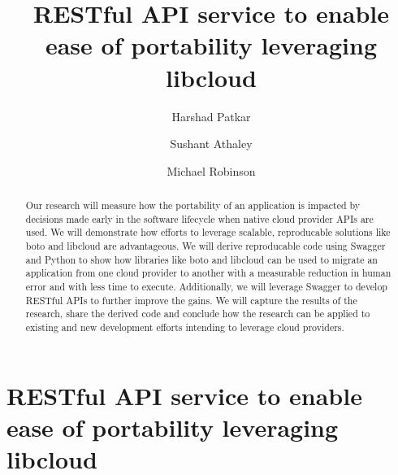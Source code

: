 
\title{RESTful API service to enable ease of portability leveraging libcloud}


\author{Harshad Patkar}

\author{Sushant Athaley}

\author{Michael Robinson}


\renewcommand{\shortauthors}{H. Pitkar, S. Athaley, M. Robinson}


\begin{abstract}
Our research will measure how the portability of an application is
impacted by decisions made early in the software lifecycle when native
cloud provider APIs are used. We will demonstrate how efforts to
leverage scalable, reproducable solutions like boto and libcloud are
advantageous. We will derive reproducable code using Swagger and Python
to show how libraries like boto and libcloud can be used to migrate an
application from one cloud provider to another with a measurable
reduction in human error and with less time to execute. Additionally, we
will leverage Swagger to develop RESTful APIs to further improve the
gains. We will capture the results of the research, share the derived
code and conclude how the research can be applied to existing and new
development efforts intending to leverage cloud providers. 
\end{abstract}



\maketitle

\section{RESTful API service to enable ease of portability leveraging 
libcloud}\label{restful-api-service-to-enable-ease-of-portability-
leveraging-libcloud}


